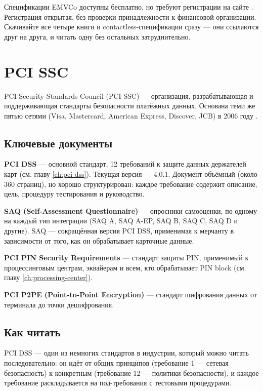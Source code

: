 \begin{kaobox}[title=На практике]
  Спецификации EMVCo доступны бесплатно, но требуют регистрации
  на сайте . Регистрация открытая, без проверки
  принадлежности к финансовой организации. Скачивайте все четыре
  книги и contactless-спецификации сразу — они ссылаются друг
  на друга, и читать одну без остальных затруднительно.
\end{kaobox}

\section{PCI SSC}
\label{sec:ps-pci}

PCI Security Standards Council (PCI SSC) — организация, разрабатывающая и поддерживающая стандарты безопасности
платёжных данных. Основана теми же пятью сетями (Visa, Mastercard, American Express, Discover, JCB) в 2006 году
.

\subsection*{Ключевые документы}

\textbf{PCI DSS} — основной стандарт, 12 требований
к защите данных держателей
карт (см. главу \ref{ch:pci-dss}). Текущая версия —
4.0.1. Документ объёмный (около 360 страниц), но хорошо
структурирован: каждое требование содержит описание,
цель, процедуру тестирования и руководство.

\textbf{SAQ (Self-Assessment Questionnaire)} — опросники
самооценки, по одному на каждый тип интеграции (SAQ A,
SAQ A-EP, SAQ B, SAQ C, SAQ D и другие). SAQ — сокращённая
версия PCI DSS, применимая к мерчанту в зависимости
от того, как он обрабатывает карточные
данные.

\textbf{PCI PIN Security Requirements} — стандарт защиты
PIN, применимый к процессинговым центрам, эквайерам
и всем, кто обрабатывает PIN
block (см. главу \ref{ch:processing-center}).

\textbf{PCI P2PE (Point-to-Point Encryption)} — стандарт
шифрования данных от терминала до точки
дешифрования.

\subsection*{Как читать}

PCI DSS — один из немногих стандартов в индустрии, который можно читать последовательно: он идёт от общих принципов
(требование 1 — сетевая безопасность) к конкретным (требование 12 — политики безопасности), и каждое требование
раскладывается на под-требования с тестовыми процедурами.

